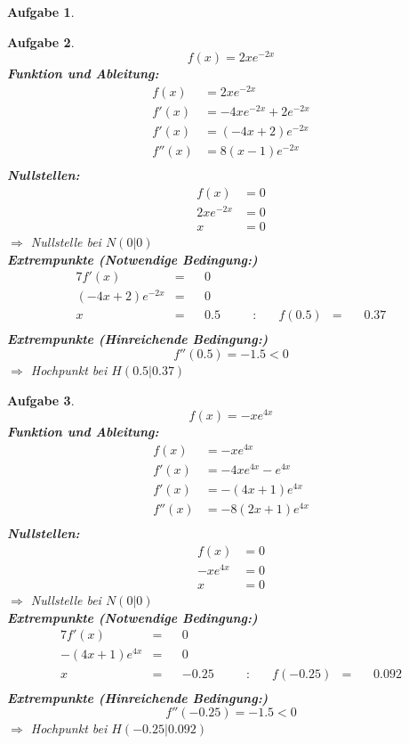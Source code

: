 \documentclass[12pt]{article}
\theoremstyle{note}
\newtheorem{aufgabe}{Aufgabe}
\begin{document}
\begin{flushleft}
\begin{aufgabe}
\end{aufgabe}\clearpage\begin{aufgabe} ~  
$$f(x)=2 x e^{- 2 x}$$ 
{\bf Funktion und Ableitung:} 
\begin{align*} 
f(x)&=2 x e^{- 2 x}\\ 
f'(x)&=- 4 x e^{- 2 x} + 2 e^{- 2 x}\\ 
f'(x)&=\left(- 4 x + 2\right) e^{- 2 x}\\ 
f''(x)&=8 \left(x - 1\right) e^{- 2 x}\\ 
\end{align*} 
{\bf Nullstellen:} 
\begin{align*} 
f(x)&=0 \\ 
2 x e^{- 2 x}&=0 \\ 
x&=0\end{align*} 
$\Rightarrow$ Nullstelle bei $N(0|0)$ \\ 
{\bf Extrempunkte (Notwendige Bedingung:)} 
\begin{alignat*}{7} 
f'(x)&=& &0& \\ 
\left(- 4 x + 2\right) e^{- 2 x}&=& &0& \\ 
x&=& &0.5& \quad &:& \quad f(0.5)&=& \, &0.37\\ 
\end{alignat*} 
{\bf Extrempunkte (Hinreichende Bedingung:)} 
\\ 
$$f''(0.5)=-1.5< 0 $$ 
$\Rightarrow$ Hochpunkt bei $H(0.5|0.37)$ \\ 

\end{aufgabe}\clearpage\begin{aufgabe} ~  
$$f(x)=- x e^{4 x}$$ 
{\bf Funktion und Ableitung:} 
\begin{align*} 
f(x)&=- x e^{4 x}\\ 
f'(x)&=- 4 x e^{4 x} - e^{4 x}\\ 
f'(x)&=- \left(4 x + 1\right) e^{4 x}\\ 
f''(x)&=- 8 \left(2 x + 1\right) e^{4 x}\\ 
\end{align*} 
{\bf Nullstellen:} 
\begin{align*} 
f(x)&=0 \\ 
- x e^{4 x}&=0 \\ 
x&=0\end{align*} 
$\Rightarrow$ Nullstelle bei $N(0|0)$ \\ 
{\bf Extrempunkte (Notwendige Bedingung:)} 
\begin{alignat*}{7} 
f'(x)&=& &0& \\ 
- \left(4 x + 1\right) e^{4 x}&=& &0& \\ 
x&=& &-0.25& \quad &:& \quad f(-0.25)&=& \, &0.092\\ 
\end{alignat*} 
{\bf Extrempunkte (Hinreichende Bedingung:)} 
\\ 
$$f''(-0.25)=-1.5< 0 $$ 
$\Rightarrow$ Hochpunkt bei $H(-0.25|0.092)$ \\ 


\end{aufgabe}
\end{flushleft}
\end{document}
